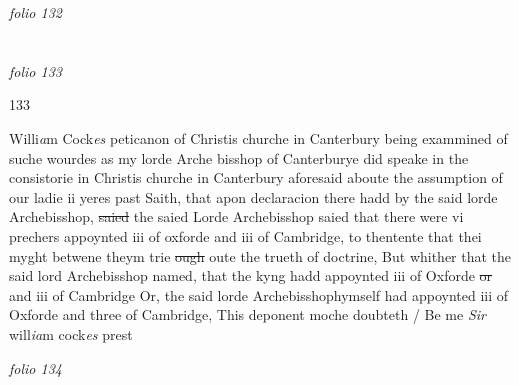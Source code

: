 \documentclass[12pt, a4paper]{book}
\begin{document}
\textit{folio 132}


         \vspace*{4cm}
         
\dotfill
						  \section*{}  \subsection*{}

\textit{folio 133}



\begin{flushright}{\color{Mahogany}133}\end{flushright}

		\ifthenelse{\isodd{\thepage}}
		{\reversemarginpar}
		{\normalmarginpar}
		Willi\textit{a}m Cock\textit{es} peticanon of Christis churche
	in Canterbury being exammined of suche wourdes as
	my lorde Arche bisshop of Canterburye did speake
	in the consistorie in Christis churche in Canterbury
 aforesaid aboute the assumption
			 of our ladie ii yeres past
			 Saith, that apon declaracion
	there hadd by the said lorde Archebisshop, \sout{saied}
	the saied Lorde Archebisshop saied that there
	were vi prechers appoynted iii of oxforde and
	iii of Cambridge, to thentente that thei myght
 betwene theym trie \sout{ough} oute the trueth of
 doctrine, But whither that the said lord
 Archebisshop named, that the kyng hadd
	appoynted iii of Oxforde \sout{or} and
			 iii of Cambridge
	Or, the said lorde Archebisshophymself had
	appoynted iii of Oxforde and three of
 Cambridge, This deponent moche
	doubteth / Be me \textit{Sir} will\textit{ia}m cock\textit{es} prest

\dotfill
						\newpage
{}

\textit{folio 134}


         \vspace*{4cm}
         
\dotfill
						  \section*{}  \subsection*{}
\end{document}
